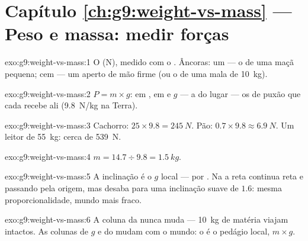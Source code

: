 \section*{Capítulo \ref{ch:g9:weight-vs-mass} --- Peso e massa: medir forças}

\begin{solution}{exo:g9:weight-vs-mass:1}
O  (\unit{N}), medido com o . Âncoras: um  ---
o  de uma maçã pequena; cem --- um aperto de mão firme (ou o 
de uma mala de \qty{10}{kg}).
\end{solution}

\begin{solution}{exo:g9:weight-vs-mass:2}
$P = m \times g$:  em ,  em  e $g$ --- a
 do lugar --- os  de puxão que cada
 recebe ali (\qty{9.8}{N/kg} na Terra).
\end{solution}

\begin{solution}{exo:g9:weight-vs-mass:3}
Cachorro: $25 \times 9.8 = \qty{245}{N}$. Pão:
$0.7 \times 9.8 \approx \qty{6.9}{N}$. Um leitor de \qty{55}{kg}:
cerca de \qty{539}{N}.
\end{solution}

\begin{solution}{exo:g9:weight-vs-mass:4}
$m = 14.7 \div 9.8 = \qty{1.5}{kg}$.
\end{solution}

\begin{solution}{exo:g9:weight-vs-mass:5}
A inclinação é o $g$ local ---  por . Na  a reta
continua reta e passando pela origem, mas desaba para uma inclinação
suave de $1.6$: mesma proporcionalidade, mundo mais fraco.
\end{solution}

\begin{solution}{exo:g9:weight-vs-mass:6}
A coluna da  nunca muda --- \qty{10}{kg} de matéria viajam
intactos. As colunas de $g$ e do  mudam com o mundo: o  é o
pedágio local, $m \times g$.
\end{solution}

